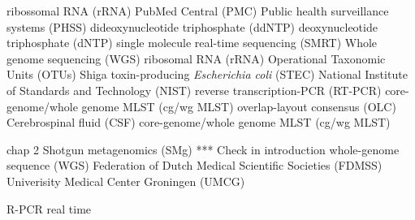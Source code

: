 
\begin{acronym}[MPC] %




\end{acronym}


ribossomal RNA (rRNA)
PubMed Central\textsuperscript{\small\textregistered} (PMC)
Public health surveillance systems (PHSS)
dideoxynucleotide triphosphate (ddNTP) 
deoxynucleotide triphosphate (dNTP)
single molecule real-time sequencing (SMRT)
Whole genome sequencing (WGS)
ribosomal RNA (rRNA)
Operational Taxonomic Units (OTUs)
Shiga toxin-producing \textit{Escherichia coli} (STEC)
National Institute of Standards and Technology (NIST)
reverse transcription-PCR (RT-PCR)
core-genome/whole genome MLST (cg/wg MLST)
overlap-layout consensus (OLC)
Cerebrospinal fluid (CSF)
core-genome/whole genome MLST (cg/wg MLST)

chap 2 
Shotgun metagenomics (SMg) *** Check in introduction
whole-genome sequence (WGS)
Federation of Dutch Medical Scientific Societies (FDMSS)
Univerisity Medical Center Groningen (UMCG)

R-PCR real time 